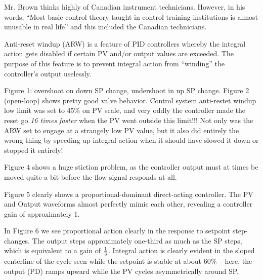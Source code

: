 












Mr. Brown thinks highly of Canadian instrument technicians.  However, in his words, ``Most basic control theory taught in control training institutions is almost unusable in real life'' and this included the Canadian technicians.

\vskip 10pt

Anti-reset windup (ARW) is a feature of PID controllers whereby the integral action gets disabled if certain PV and/or output values are exceeded.  The purpose of this feature is to prevent integral action from ``winding'' the controller's output uselessly.

\vskip 10pt

Figure 1: overshoot on down SP change, undershoot in up SP change.  Figure 2 (open-loop) shows pretty good valve behavior.  Control system anti-restet windup low limit was set to 45\% on PV scale, and very oddly the controller made the reset go {\it 16 times faster} when the PV went outside this limit!!!  Not only was the ARW set to engage at a strangely low PV value, but it also did entirely the wrong thing by speeding up integral action when it should have slowed it down or stopped it entirely!

\vskip 10pt

Figure 4 shows a huge stiction problem, as the controller output must at times be moved quite a bit before the flow signal responds at all.

\vskip 10pt

Figure 5 clearly shows a proportional-dominant direct-acting controller.  The PV and Output waveforms almost perfectly mimic each other, revealing a controller gain of approximately 1.

\vskip 10pt

In Figure 6 we see proportional action clearly in the response to setpoint step-changes.  The output steps approximately one-third as much as the SP steps, which is equivalent to a gain of $1 \over 3$.  Integral action is clearly evident in the sloped centerline of the cycle seen while the setpoint is stable at about 60\% -- here, the output (PD) ramps upward while the PV cycles asymmetrically around SP.





